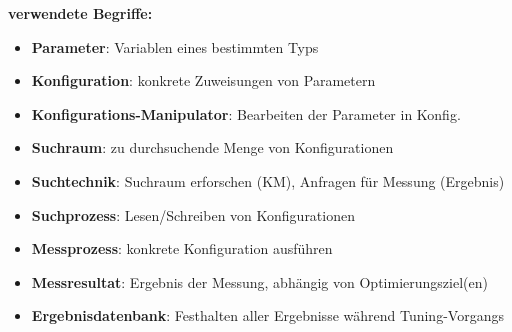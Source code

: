   \begingroup
  \begin{frame}
    \textbf{verwendete Begriffe:}
    
  \begin{itemize}

    \item \textbf{Parameter}: Variablen eines bestimmten Typs 
    
    \item \textbf{Konfiguration}: konkrete Zuweisungen von Parametern
    \item \textbf{Konfigurations-Manipulator}: Bearbeiten der Parameter in Konfig. \newline
    
    \item \textbf{Suchraum}: zu durchsuchende Menge von Konfigurationen
    
    \item \textbf{Suchtechnik}: Suchraum erforschen (KM), Anfragen für Messung (Ergebnis)
     
    \item \textbf{Suchprozess}: Lesen/Schreiben von Konfigurationen \newline
    \item \textbf{Messprozess}: konkrete Konfiguration ausführen
    \item \textbf{Messresultat}: Ergebnis der Messung, abhängig von Optimierungsziel(en)
    \item \textbf{Ergebnisdatenbank}: Festhalten aller Ergebnisse während Tuning-Vorgangs
    
  \end{itemize}
  \end{frame}
  \endgroup
        
